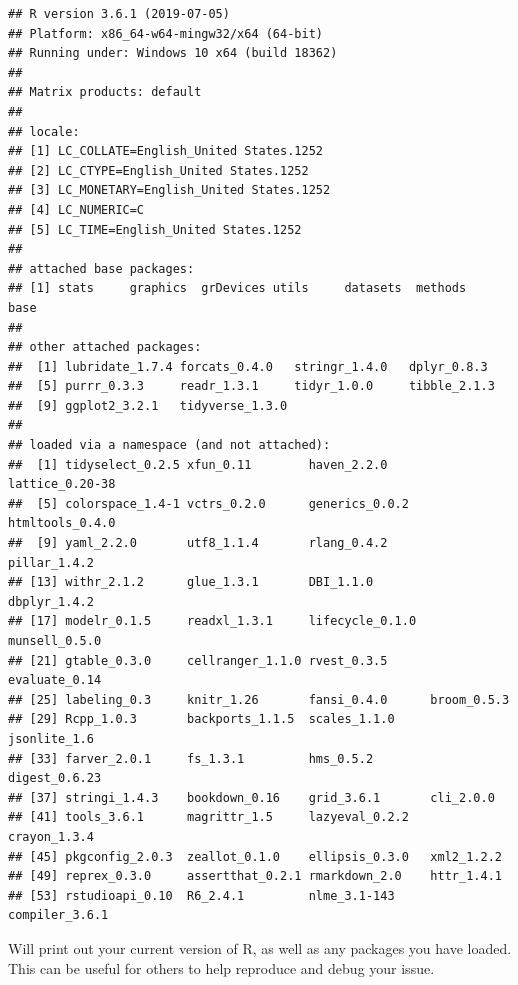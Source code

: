 \documentclass[]{book}
\begin{document}
\begin{verbatim}
## R version 3.6.1 (2019-07-05)
## Platform: x86_64-w64-mingw32/x64 (64-bit)
## Running under: Windows 10 x64 (build 18362)
## 
## Matrix products: default
## 
## locale:
## [1] LC_COLLATE=English_United States.1252 
## [2] LC_CTYPE=English_United States.1252   
## [3] LC_MONETARY=English_United States.1252
## [4] LC_NUMERIC=C                          
## [5] LC_TIME=English_United States.1252    
## 
## attached base packages:
## [1] stats     graphics  grDevices utils     datasets  methods   base     
## 
## other attached packages:
##  [1] lubridate_1.7.4 forcats_0.4.0   stringr_1.4.0   dplyr_0.8.3    
##  [5] purrr_0.3.3     readr_1.3.1     tidyr_1.0.0     tibble_2.1.3   
##  [9] ggplot2_3.2.1   tidyverse_1.3.0
## 
## loaded via a namespace (and not attached):
##  [1] tidyselect_0.2.5 xfun_0.11        haven_2.2.0      lattice_0.20-38 
##  [5] colorspace_1.4-1 vctrs_0.2.0      generics_0.0.2   htmltools_0.4.0 
##  [9] yaml_2.2.0       utf8_1.1.4       rlang_0.4.2      pillar_1.4.2    
## [13] withr_2.1.2      glue_1.3.1       DBI_1.1.0        dbplyr_1.4.2    
## [17] modelr_0.1.5     readxl_1.3.1     lifecycle_0.1.0  munsell_0.5.0   
## [21] gtable_0.3.0     cellranger_1.1.0 rvest_0.3.5      evaluate_0.14   
## [25] labeling_0.3     knitr_1.26       fansi_0.4.0      broom_0.5.3     
## [29] Rcpp_1.0.3       backports_1.1.5  scales_1.1.0     jsonlite_1.6    
## [33] farver_2.0.1     fs_1.3.1         hms_0.5.2        digest_0.6.23   
## [37] stringi_1.4.3    bookdown_0.16    grid_3.6.1       cli_2.0.0       
## [41] tools_3.6.1      magrittr_1.5     lazyeval_0.2.2   crayon_1.3.4    
## [45] pkgconfig_2.0.3  zeallot_0.1.0    ellipsis_0.3.0   xml2_1.2.2      
## [49] reprex_0.3.0     assertthat_0.2.1 rmarkdown_2.0    httr_1.4.1      
## [53] rstudioapi_0.10  R6_2.4.1         nlme_3.1-143     compiler_3.6.1
\end{verbatim}

Will print out your current version of R, as well as any packages you
have loaded. This can be useful for others to help reproduce and debug
your issue.
\end{document}
